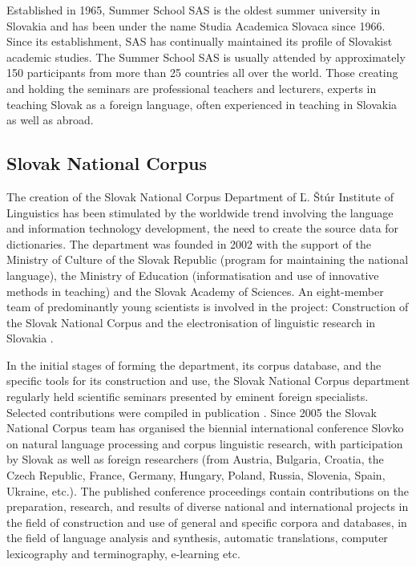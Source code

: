 \begin{multicols}{2}

Established in 1965, Summer School SAS is the oldest summer university in Slovakia and has been under the name Studia Academica Slovaca since 1966. Since its establishment, SAS has continually maintained its profile of Slovakist academic studies. The Summer School SAS is usually attended by approximately 150 participants from more than 25 countries all over the world. Those creating and holding the seminars are professional teachers and lecturers, experts in teaching Slovak as a foreign language, often experienced in teaching in Slovakia as well as abroad.

\subsection{Slovak National Corpus}
The creation of the Slovak National Corpus Department of Ľ. Štúr
Institute of Linguistics has been stimulated by the worldwide trend
involving the language and information technology development, the need
to create the source data for dictionaries. The department was founded
in 2002 with the support of the Ministry of Culture of the Slovak
Republic (program for maintaining the national language), the Ministry
of Education (informatisation and use of innovative  methods in
teaching) and the Slovak Academy of Sciences. An eight-member team of
predominantly young scientists is involved in the project: Construction
of the Slovak National Corpus and the electronisation of linguistic
research in Slovakia \cite{simkova2006b}.

In the initial stages of forming the department, its corpus database,
and the specific tools for its construction and use, the Slovak National
Corpus department regularly held scientific seminars presented by
eminent foreign specialists. Selected contributions were compiled in
publication \cite{simkova2006a}. Since 2005 the Slovak National Corpus
team has organised the biennial international conference Slovko\cite{f10} on
natural language processing and corpus linguistic research, with
participation by Slovak as well as foreign researchers (from Austria,
Bulgaria, Croatia, the Czech Republic, France, Germany, Hungary, Poland,
Russia, Slovenia, Spain, Ukraine, etc.). The published conference
proceedings contain contributions on the preparation, research, and
results of diverse national and international projects in the field of
construction and use of general and specific corpora and databases, in
the field of language analysis and synthesis, automatic translations,
computer lexicography and terminography, e-learning etc. 


\end{multicols}

